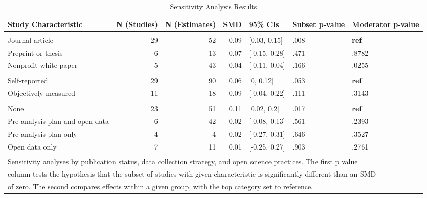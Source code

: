 \documentclass[sn-nature,referee,pdflatex]{sn-jnl}
\begin{document}
\begin{table}[!h]
\centering
\caption{\label{tab:table_three}Sensitivity Analysis Results}
\centering
\begin{tabular}[t]{lrrrlll}
\toprule
Study Characteristic & N (Studies) & N (Estimates) & SMD & 95\% CIs & Subset p-value & Moderator p-value\\
\midrule
\addlinespace[0.3em]
\multicolumn{7}{l}{\textbf{Publication Status}}\\
\hspace{1em}Journal article & 29 & 52 & 0.09 & {}[0.03, 0.15] & .008 & \textbf{ref}\\
\hspace{1em}Preprint or thesis & 6 & 13 & 0.07 & {}[-0.15, 0.28] & .471 & .8782\\
\hspace{1em}Nonprofit white paper & 5 & 43 & -0.04 & {}[-0.11, 0.04] & .166 & .0255\\
\addlinespace[0.3em]
\multicolumn{7}{l}{\textbf{Data Collection Strategy}}\\
\hspace{1em}Self-reported & 29 & 90 & 0.06 & {}[0, 0.12] & .053 & \textbf{ref}\\
\hspace{1em}Objectively measured & 11 & 18 & 0.09 & {}[-0.04, 0.22] & .111 & .3143\\
\addlinespace[0.3em]
\multicolumn{7}{l}{\textbf{Open Science}}\\
\hspace{1em}None & 23 & 51 & 0.11 & {}[0.02, 0.2] & .017 & \textbf{ref}\\
\hspace{1em}Pre-analysis plan and open data & 6 & 42 & 0.02 & {}[-0.08, 0.13] & .561 & .2393\\
\hspace{1em}Pre-analysis plan only & 4 & 4 & 0.02 & {}[-0.27, 0.31] & .646 & .3527\\
\hspace{1em}Open data only & 7 & 11 & 0.01 & {}[-0.25, 0.27] & .903 & .2761\\
\bottomrule
\multicolumn{7}{l}{\textsuperscript{} Sensitivity analyses by publication status, data collection strategy, and open science practices. The first p value}\\
\multicolumn{7}{l}{column tests the hypothesis that the subset of studies with given characteristic is significantly different than an SMD}\\
\multicolumn{7}{l}{of zero. The second compares effects within a given group, with the top category set to reference.}\\
\end{tabular}
\end{table}
\end{document}
